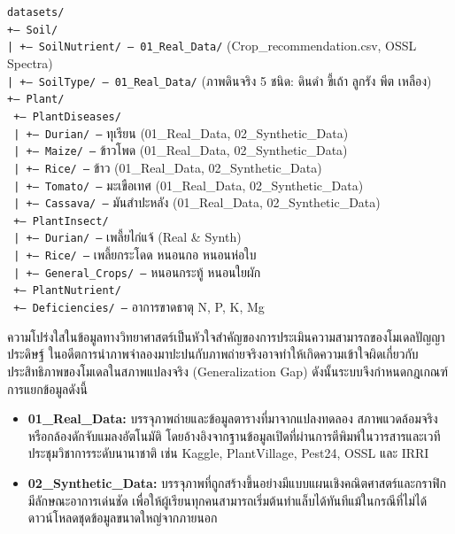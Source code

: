 \begin{tcolorbox}[title=\textbf{ผังโครงสร้างไดเรกทอรีระบบ Smart Agri Datasets}]
\fontsize{8.5}{11}\selectfont\raggedright
\texttt{datasets/}\\
\texttt{+-- Soil/}\\
\texttt{|   +-- SoilNutrient/ -- 01\_Real\_Data/} (Crop\_recommendation.csv, OSSL Spectra)\\
\texttt{|   +-- SoilType/     -- 01\_Real\_Data/} (ภาพดินจริง 5 ชนิด: ดินดำ ขี้เถ้า ลูกรัง พีต เหลือง)\\
\texttt{+-- Plant/}\\
\texttt{    +-- PlantDiseases/}\\
\texttt{    |   +-- Durian/          --} ทุเรียน (01\_Real\_Data, 02\_Synthetic\_Data)\\
\texttt{    |   +-- Maize/           --} ข้าวโพด (01\_Real\_Data, 02\_Synthetic\_Data)\\
\texttt{    |   +-- Rice/            --} ข้าว (01\_Real\_Data, 02\_Synthetic\_Data)\\
\texttt{    |   +-- Tomato/          --} มะเขือเทศ (01\_Real\_Data, 02\_Synthetic\_Data)\\
\texttt{    |   +-- Cassava/         --} มันสำปะหลัง (01\_Real\_Data, 02\_Synthetic\_Data)\\
\texttt{    +-- PlantInsect/}\\
\texttt{    |   +-- Durian/          --} เพลี้ยไก่แจ้ (Real \& Synth)\\
\texttt{    |   +-- Rice/            --} เพลี้ยกระโดด หนอนกอ หนอนห่อใบ\\
\texttt{    |   +-- General\_Crops/   --} หนอนกระทู้ หนอนใยผัก\\
\texttt{    +-- PlantNutrient/}\\
\texttt{        +-- Deficiencies/    --} อาการขาดธาตุ N, P, K, Mg
\end{tcolorbox}

\label{sec:real_vs_synthetic}

ความโปร่งใสในข้อมูลทางวิทยาศาสตร์เป็นหัวใจสำคัญของการประเมินความสามารถของโมเดลปัญญาประดิษฐ์ ในอดีตการนำภาพจำลองมาปะปนกับภาพถ่ายจริงอาจทำให้เกิดความเข้าใจผิดเกี่ยวกับประสิทธิภาพของโมเดลในสภาพแปลงจริง (Generalization Gap) ดังนั้นระบบจึงกำหนดกฎเกณฑ์การแยกข้อมูลดังนี้

\begin{itemize}
    \item \textbf{01\_Real\_Data:} บรรจุภาพถ่ายและข้อมูลตารางที่มาจากแปลงทดลอง สภาพแวดล้อมจริง หรือกล้องดักจับแมลงอัตโนมัติ โดยอ้างอิงจากฐานข้อมูลเปิดที่ผ่านการตีพิมพ์ในวารสารและเวทีประชุมวิชาการระดับนานาชาติ เช่น Kaggle, PlantVillage, Pest24, OSSL และ IRRI
    \item \textbf{02\_Synthetic\_Data:} บรรจุภาพที่ถูกสร้างขึ้นอย่างมีแบบแผนเชิงคณิตศาสตร์และกราฟิก มีลักษณะอาการเด่นชัด เพื่อให้ผู้เรียนทุกคนสามารถเริ่มต้นทำแล็บได้ทันทีแม้ในกรณีที่ไม่ได้ดาวน์โหลดชุดข้อมูลขนาดใหญ่จากภายนอก
\end{itemize}

